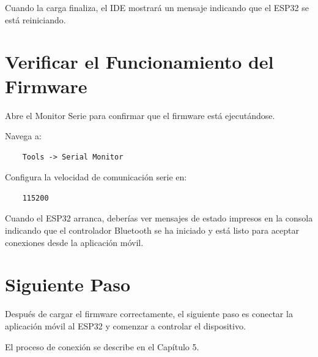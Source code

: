 Cuando la carga finaliza, el IDE mostrará un mensaje indicando que el ESP32 se está reiniciando.

\section{Verificar el Funcionamiento del Firmware}

Abre el Monitor Serie para confirmar que el firmware está ejecutándose.

Navega a:

\begin{verbatim}
    Tools -> Serial Monitor
\end{verbatim}

Configura la velocidad de comunicación serie en:

\begin{verbatim}
    115200
\end{verbatim}

Cuando el ESP32 arranca, deberías ver mensajes de estado impresos en la consola indicando que el controlador
Bluetooth se ha iniciado y está listo para aceptar conexiones desde la aplicación móvil.

\section{Siguiente Paso}

Después de cargar el firmware correctamente, el siguiente paso es conectar la aplicación móvil al ESP32 y comenzar
a controlar el dispositivo.

El proceso de conexión se describe en el Capítulo 5.